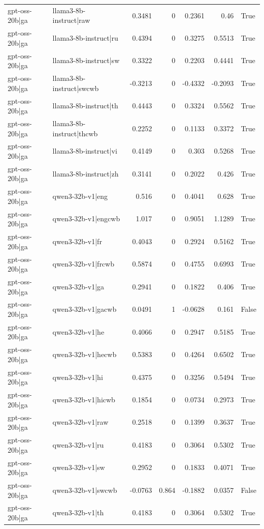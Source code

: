 \begin{table}
\begin{tabular}{l l r r r r l}
gpt-oss-20b|ga & llama3-8b-instruct|raw & 0.3481 & 0 & 0.2361 & 0.46 & True \\
gpt-oss-20b|ga & llama3-8b-instruct|ru & 0.4394 & 0 & 0.3275 & 0.5513 & True \\
gpt-oss-20b|ga & llama3-8b-instruct|sw & 0.3322 & 0 & 0.2203 & 0.4441 & True \\
gpt-oss-20b|ga & llama3-8b-instruct|swcwb & -0.3213 & 0 & -0.4332 & -0.2093 & True \\
gpt-oss-20b|ga & llama3-8b-instruct|th & 0.4443 & 0 & 0.3324 & 0.5562 & True \\
gpt-oss-20b|ga & llama3-8b-instruct|thcwb & 0.2252 & 0 & 0.1133 & 0.3372 & True \\
gpt-oss-20b|ga & llama3-8b-instruct|vi & 0.4149 & 0 & 0.303 & 0.5268 & True \\
gpt-oss-20b|ga & llama3-8b-instruct|zh & 0.3141 & 0 & 0.2022 & 0.426 & True \\
gpt-oss-20b|ga & qwen3-32b-v1|eng & 0.516 & 0 & 0.4041 & 0.628 & True \\
gpt-oss-20b|ga & qwen3-32b-v1|engcwb & 1.017 & 0 & 0.9051 & 1.1289 & True \\
gpt-oss-20b|ga & qwen3-32b-v1|fr & 0.4043 & 0 & 0.2924 & 0.5162 & True \\
gpt-oss-20b|ga & qwen3-32b-v1|frcwb & 0.5874 & 0 & 0.4755 & 0.6993 & True \\
gpt-oss-20b|ga & qwen3-32b-v1|ga & 0.2941 & 0 & 0.1822 & 0.406 & True \\
gpt-oss-20b|ga & qwen3-32b-v1|gacwb & 0.0491 & 1 & -0.0628 & 0.161 & False \\
gpt-oss-20b|ga & qwen3-32b-v1|he & 0.4066 & 0 & 0.2947 & 0.5185 & True \\
gpt-oss-20b|ga & qwen3-32b-v1|hecwb & 0.5383 & 0 & 0.4264 & 0.6502 & True \\
gpt-oss-20b|ga & qwen3-32b-v1|hi & 0.4375 & 0 & 0.3256 & 0.5494 & True \\
gpt-oss-20b|ga & qwen3-32b-v1|hicwb & 0.1854 & 0 & 0.0734 & 0.2973 & True \\
gpt-oss-20b|ga & qwen3-32b-v1|raw & 0.2518 & 0 & 0.1399 & 0.3637 & True \\
gpt-oss-20b|ga & qwen3-32b-v1|ru & 0.4183 & 0 & 0.3064 & 0.5302 & True \\
gpt-oss-20b|ga & qwen3-32b-v1|sw & 0.2952 & 0 & 0.1833 & 0.4071 & True \\
gpt-oss-20b|ga & qwen3-32b-v1|swcwb & -0.0763 & 0.864 & -0.1882 & 0.0357 & False \\
gpt-oss-20b|ga & qwen3-32b-v1|th & 0.4183 & 0 & 0.3064 & 0.5302 & True \\

\end{tabular}
\end{table}

